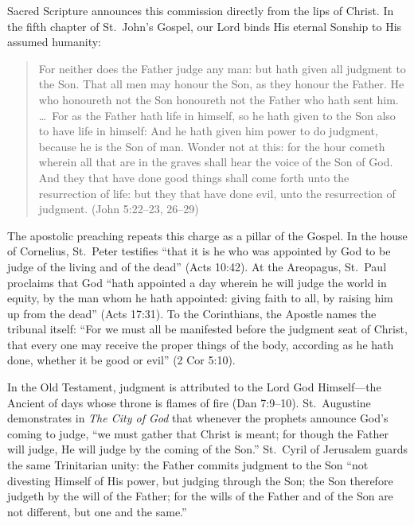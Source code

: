 Sacred Scripture announces this commission directly from the lips of Christ. In the fifth chapter of St.\ John's Gospel, our Lord binds His eternal Sonship to His assumed humanity:

\begin{quote}
For neither does the Father judge any man: but hath given all judgment to the Son. That all men may honour the Son, as they honour the Father. He who honoureth not the Son honoureth not the Father who hath sent him. \dots\ For as the Father hath life in himself, so he hath given to the Son also to have life in himself: And he hath given him power to do judgment, because he is the Son of man. Wonder not at this: for the hour cometh wherein all that are in the graves shall hear the voice of the Son of God. And they that have done good things shall come forth unto the resurrection of life: but they that have done evil, unto the resurrection of judgment. (John 5:22--23, 26--29)
\end{quote}

The apostolic preaching repeats this charge as a pillar of the Gospel. In the house of Cornelius, St.\ Peter testifies ``that it is he who was appointed by God to be judge of the living and of the dead'' (Acts 10:42). At the Areopagus, St.\ Paul proclaims that God ``hath appointed a day wherein he will judge the world in equity, by the man whom he hath appointed: giving faith to all, by raising him up from the dead'' (Acts 17:31). To the Corinthians, the Apostle names the tribunal itself: ``For we must all be manifested before the judgment seat of Christ, that every one may receive the proper things of the body, according as he hath done, whether it be good or evil'' (2 Cor 5:10).

In the Old Testament, judgment is attributed to the Lord God Himself---the Ancient of days whose throne is flames of fire (Dan 7:9--10). St.\ Augustine demonstrates in \textit{The City of God} that whenever the prophets announce God's coming to judge, ``we must gather that Christ is meant; for though the Father will judge, He will judge by the coming of the Son.'' St.\ Cyril of Jerusalem guards the same Trinitarian unity: the Father commits judgment to the Son ``not divesting Himself of His power, but judging through the Son; the Son therefore judgeth by the will of the Father; for the wills of the Father and of the Son are not different, but one and the same.''

